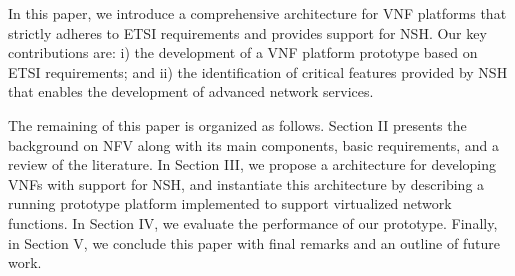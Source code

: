 

In this paper, we introduce a comprehensive architecture for VNF platforms that strictly adheres to ETSI requirements and provides support for NSH. Our key contributions are: i) the development of a VNF platform prototype based on ETSI requirements; and ii) the identification of critical features provided by NSH that enables the development of advanced network services.

The remaining of this paper is organized as follows. Section II presents the background on NFV along with its main components, basic requirements, and a review of the literature. In Section III, we propose a architecture for developing VNFs with support for NSH, and instantiate this architecture by describing a running prototype platform implemented to support virtualized network functions. In Section IV, we evaluate the performance of our prototype. Finally, in Section V, we conclude this paper with final remarks and an outline of future work.
